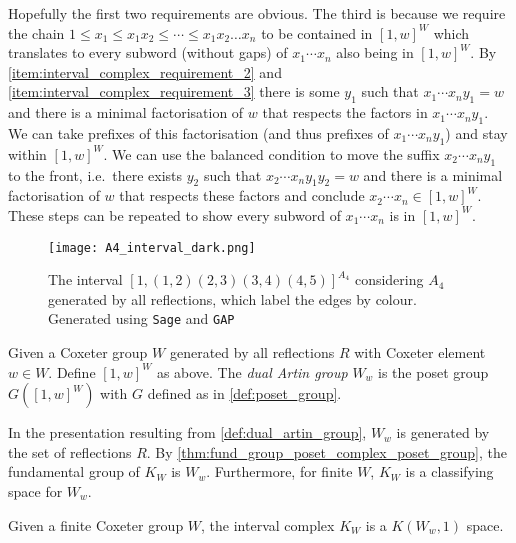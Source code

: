 \documentclass[class=article, crop=false]{standalone}
\begin{document}
Hopefully the first two requirements are obvious. The third is because we require the chain $1 \leq x_1 \leq x_1x_2 \leq \cdots \leq x_1x_2\ldots x_{n}$ to be contained in $[1,w]^W$ which translates to every subword (without gaps) of $x_1\cdots x_n$ also being in $[1,w]^W$. By \eqref{item:interval_complex_requirement_2} and \eqref{item:interval_complex_requirement_3} there is some $y_1$ such that $x_1 \cdots x_n y_1 = w$ and there is a minimal factorisation of $w$ that respects the factors in $ x_1 \cdots x_n y_1$.
We can take prefixes of this factorisation (and thus prefixes of $ x_1 \cdots x_n y_1$) and stay within $[1,w]^W$. We can use the balanced condition to move the suffix $x_2\cdots x_n y_1$ to the front, i.e.~there exists $y_2$ such that $x_2\cdots x_n y_1y_2=w$ and there is a minimal factorisation of $w$ that respects these factors and conclude $x_2\cdots x_n \in [1,w]^W$. These steps can be repeated to show every subword of $x_1 \cdots x_n $ is in $[1,w]^W$.

\begin{figure}
	\centering
	\texttt{[image: A4\_interval\_dark.png]}
	\caption{The interval $[1, (1,2)(2,3)(3,4)(4,5)]^{A_4}$ considering $A_4$ generated by all reflections, which label the edges by colour. Generated using \texttt{Sage} and \texttt{GAP} \cite{sagemath_2020, gap_2022}}
	\label{fig:A4_interval}
\end{figure}

\begin{definition}
    Given a Coxeter group $W$ generated by all reflections $R$ with Coxeter element $w \in W$. Define $[1,w]^W$ as above. The \emph{dual Artin group} $W_w$ is the poset group $G([1,w]^W)$ with $G$ defined as in \cref{def:poset_group}.
    \label{def:dual_artin_group}
\end{definition}

In the presentation resulting from \cref{def:dual_artin_group}, $W_w$ is generated by the set of reflections $R$.
By \cref{thm:fund_group_poset_complex_poset_group}, the fundamental group of $K_{W}$ is $W_w$. Furthermore, for finite $W$, $K_W$ is a classifying space for $W_w$.

\begin{theorem}
    Given a finite Coxeter group $W$, the interval complex $K_W$ is a $K(W_w,1)$ space.
    \label{thm:interval_cx_k_pi_1_finite}
\end{theorem}
\end{document}

